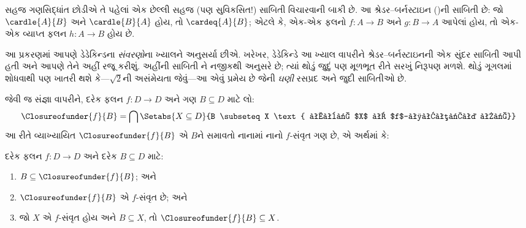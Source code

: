 
\label{guunit:OLP-0054}


સહજ ગણસિદ્ધાંત છોડીએ તે પહેલાં એક છેલ્લી સહજ (પણ સુવિકસિત!) સાબિતી
વિચારવાની બાકી છે. આ શ્રેડર--બર્નસ્ટાઇન
()ની સાબિતી છે: જો
$\cardle{A}{B}$ અને $\cardle{B}{A}$ હોય, તો $\cardeq{A}{B}$; એટલે કે,
એક-એક ફલનો $f \colon A \to B$ અને $g \colon B \to A$ આપેલાં હોય,
તો એક-એક વ્યાપ્ત ફલન $h \colon A \to B$ હોય છે.

આ પ્રકરણમાં આપણે ડેડેકિન્ડના \emph{સંવરણો}ના ખ્યાલને અનુસર્યા છીએ.
ખરેખર, ડેડેકિન્ડે આ ખ્યાલ વાપરીને શ્રેડર--બર્નસ્ટાઇનની એક સુંદર
સાબિતી આપી હતી અને આપણે તેને અહીં રજૂ કરીશું. અહીંની સાબિતી
\citet[pp.~157--8]{Potter2004}ને નજીકથી અનુસરે છે; ત્યાં થોડું જુદું
પણ મૂળભૂત રીતે સરખું નિરૂપણ મળશે. થોડું ગૂગલમાં
શોધવાથી પણ ખાતરી થશે કે---$\sqrt{2}$ની અસંમેયતા જેવું---આ એવું પ્રમેય
છે જેની \emph{ઘણી} રસપ્રદ અને જુદી સાબિતીઓ છે.

 જેવી જ સંજ્ઞા વાપરીને,
દરેક ફલન $f\colon D\to D$ અને ગણ $B\subseteq D$ માટે લો:
\[
\Closureofunder{f}{B} = \bigcap \Setabs{X\subseteq D}{B \subseteq X
\text{ અને $X$ એ $f$-સંવૃત છે}}
\]
આ રીતે વ્યાખ્યાયિત $\Closureofunder{f}{B}$ એ $B$ને સમાવતો નાનામાં
નાનો $f$-સંવૃત ગણ છે, એ અર્થમાં કે:

\begin{lem}
	દરેક ફલન $f\colon D\to D$ અને દરેક $B\subseteq D$ માટે:
	\begin{enumerate}
		\item{} $B \subseteq \Closureofunder{f}{B}$; અને
		\item{} $\Closureofunder{f}{B}$ એ $f$-સંવૃત છે; અને
		\item{} જો $X$ એ $f$-સંવૃત હોય અને $B
		\subseteq X$, તો $\Closureofunder{f}{B} \subseteq X$.
	\end{enumerate}
\end{lem}

